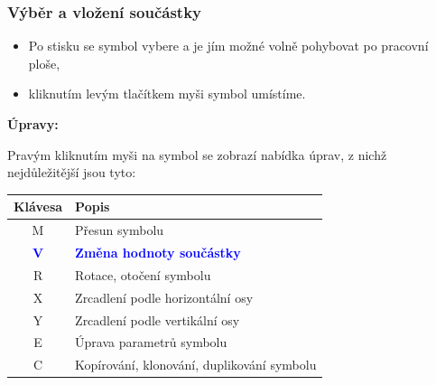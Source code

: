 \documentclass{beamer}
\begin{document}
\begin{frame}
	\frametitle{Výběr a vložení součástky}
	
	\begin{itemize}
		\item Po stisku  se symbol vybere a je jím možné volně pohybovat po pracovní ploše,
		\item kliknutím levým tlačítkem myši symbol umístíme.
	\end{itemize}
	
	\textbf{Úpravy:}
	
	Pravým kliknutím myši na symbol se  zobrazí nabídka úprav, z nichž nejdůležitější jsou tyto:
	
	\begin{center}
		\begin{tabular}{| c | l |}
			\hline
			\textbf{Klávesa} & \textbf{Popis} \\ \hline
			M & Přesun symbolu \\ \hline
			\textcolor{blue}{\textbf{V}} & \textcolor{blue}{\textbf{Změna hodnoty součástky}} \\ \hline
			R & Rotace, otočení symbolu \\ \hline
			X & Zrcadlení podle horizontální osy \\ \hline
			Y & Zrcadlení podle vertikální osy \\ \hline
			E & Úprava parametrů symbolu \\ \hline
			C & Kopírování, klonování, duplikování symbolu \\ \hline
		\end{tabular}
	\end{center}
	
\end{frame}
\end{document}
